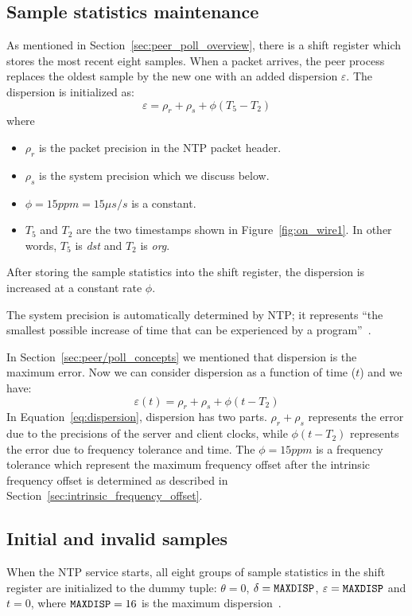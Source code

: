 \subsection{Sample statistics maintenance}%
\label{sub:sample_statistics_maintenance}
As mentioned in Section~\ref{sec:peer_poll_overview}, there is a shift register
which stores the most recent eight samples. When a packet arrives, the peer
process replaces the oldest sample by the new one with an added dispersion
$\varepsilon$.
The dispersion is initialized as:
$$ \varepsilon = \rho_r + \rho_s + \phi (T_5 - T_2) $$
where 
\begin{itemize}
    \item 
        $\rho_r$ is the packet precision in the NTP packet header. 
    \item 
        $\rho_s$ is the system
        precision which we discuss below.
    \item
        $\phi = 15 ppm = 15 \mu s/s$ is a constant.
    \item
        $T_5$ and $T_2$ are the two timestamps shown in
        Figure~\ref{fig:on_wire1}. In other words, $T_5$ is \emph{dst} and
        $T_2$ is \emph{org}.
\end{itemize}
After storing the sample statistics into the shift register, the dispersion
is increased at a constant rate $\phi$. 

The system precision is automatically determined by NTP; it represents 
``the smallest possible increase of time that can be experienced by a
program''~\cite{precision}.

In Section~\ref{sec:peer/poll_concepts} we mentioned that dispersion is the
maximum error. Now we can consider dispersion as a function of time ($t$) and
we have:
\begin{equation}
    \varepsilon(t) = \rho_r + \rho_s + \phi (t - T_2)
    \label{eq:dispersion}
\end{equation}
In Equation~\ref{eq:dispersion}, dispersion has two parts. $\rho_r + \rho_s$
represents the error due to the precisions of the server and client clocks,
while $\phi (t - T_2)$ represents the error due to frequency tolerance and
time.  The $\phi = 15ppm$ is a frequency tolerance which represent the maximum
frequency offset after the intrinsic frequency offset is determined as
described in Section~\ref{sec:intrinsic_frequency_offset}.

\subsection{Initial and invalid samples}%
\label{sub:initial_and_invalid_samples}
When the NTP service starts, all eight groups of sample statistics in the shift
register are initialized to the dummy tuple: $\theta = 0$, $\delta =
\verb|MAXDISP|$, $\varepsilon = \verb|MAXDISP|$ and $t = 0$, where $\verb|MAXDISP|
= 16$ is the maximum dispersion~\cite{rfc5905}.

